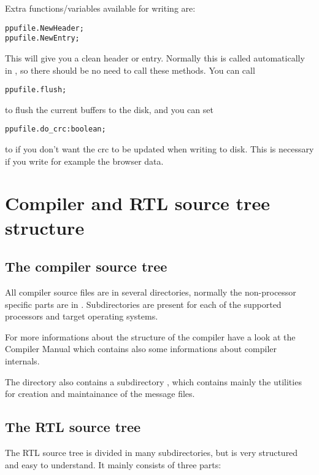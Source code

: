 Extra functions/variables available for writing are:
\begin{verbatim}
ppufile.NewHeader;
ppufile.NewEntry;
\end{verbatim}
This will give you a clean header or entry. Normally this is called
automatically in , so there should be no need to
call these methods. You can call
\begin{verbatim}
ppufile.flush;
\end{verbatim}
to flush the current buffers to the disk, and you can set
\begin{verbatim}
ppufile.do_crc:boolean;
\end{verbatim}
to  if you don't want the crc to be updated when writing to disk.
This is necessary if you write for example the browser data.


\chapter{Compiler and RTL source tree structure}
\label{ch:AppB}

\section{The compiler source tree}

All compiler source files are in several directories, normally the
non-processor specific parts are in . Subdirectories
are present for each of the supported processors and target operating systems.

For more informations about the structure of the compiler have a look at the
Compiler Manual which contains also some informations about
compiler internals.

The  directory also contains a subdirectory ,
which contains mainly the utilities for creation and maintainance of the
message files.

\section{The RTL source tree}
The RTL source tree is divided in many subdirectories, but is very
structured and easy to understand. It mainly consists of three parts:

